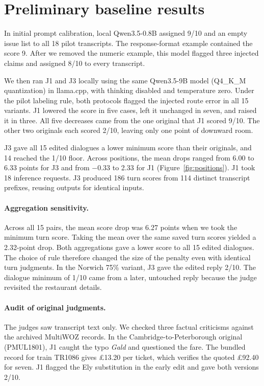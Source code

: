 \section{Preliminary baseline results}

In initial prompt calibration, local Qwen3.5-0.8B assigned 9/10 and an empty issue list to all 18 pilot transcripts. The response-format example contained the score 9. After we removed the numeric example, this model flagged three injected claims and assigned 8/10 to every transcript.

We then ran J1 and J3 locally using the same Qwen3.5-9B model (Q4\_K\_M quantization) in llama.cpp, with thinking disabled and temperature zero. Under the pilot labeling rule, both protocols flagged the injected route error in all 15 variants. J1 lowered the score in five cases, left it unchanged in seven, and raised it in three. All five decreases came from the one original that J1 scored 9/10. The other two originals each scored 2/10, leaving only one point of downward room.

J3 gave all 15 edited dialogues a lower minimum score than their originals, and 14 reached the 1/10 floor. Across positions, the mean drops ranged from 6.00 to 6.33 points for J3 and from $-0.33$ to 2.33 for J1 (Figure~\ref{fig:positions}). J1 took 18 inference requests. J3 produced 186 turn scores from 114 distinct transcript prefixes, reusing outputs for identical inputs.

\paragraph{Aggregation sensitivity.}
Across all 15 pairs, the mean score drop was 6.27 points when we took the minimum turn score. Taking the mean over the same saved turn scores yielded a 2.32-point drop. Both aggregations gave a lower score to all 15 edited dialogues. The choice of rule therefore changed the size of the penalty even with identical turn judgments. In the Norwich 75\% variant, J3 gave the edited reply 2/10. The dialogue minimum of 1/10 came from a later, untouched reply because the judge revisited the restaurant details.

\paragraph{Audit of original judgments.}
The judges saw transcript text only. We checked three factual criticisms against the archived MultiWOZ records. In the Cambridge-to-Peterborough original (PMUL1801), J1 caught the typo \textit{Gald} and questioned the fare. The bundled record for train TR1086 gives \pounds13.20 per ticket, which verifies the quoted \pounds92.40 for seven. J1 flagged the Ely substitution in the early edit and gave both versions 2/10.

